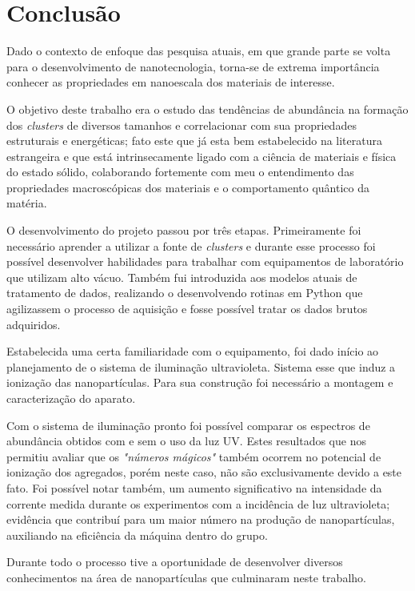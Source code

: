 \chapter{Conclusão}
\label{sec:conclusao}

Dado o contexto de enfoque das pesquisa atuais, em que grande parte se volta para o desenvolvimento de nanotecnologia, torna-se de extrema importância conhecer as propriedades em nanoescala dos materiais de interesse.

O objetivo deste trabalho era o estudo das tendências de abundância na formação dos \textit{clusters} de diversos tamanhos e correlacionar com sua propriedades estruturais e energéticas; fato este que já esta bem estabelecido na literatura estrangeira e que está intrinsecamente ligado com a ciência de materiais e física do estado sólido, colaborando fortemente com meu o entendimento das propriedades macroscópicas dos materiais e o comportamento quântico da matéria.

O desenvolvimento do projeto passou por três etapas. Primeiramente foi necessário aprender a utilizar a fonte de \textit{clusters} e durante esse processo foi possível desenvolver habilidades para trabalhar com equipamentos de laboratório que utilizam alto vácuo. Também fui introduzida aos modelos atuais de tratamento de dados, realizando o desenvolvendo rotinas em Python que agilizassem o processo de aquisição e fosse possível tratar os dados brutos adquiridos.

Estabelecida uma certa familiaridade com o equipamento, foi dado início ao planejamento de o sistema de iluminação ultravioleta. Sistema esse que induz a ionização das nanopartículas. Para sua construção foi necessário a montagem e caracterização do aparato.

Com o sistema de iluminação pronto foi possível comparar os espectros de abundância obtidos com e sem o uso da luz UV. Estes resultados que nos permitiu avaliar que os \textit{"números mágicos"} também ocorrem no potencial de ionização dos agregados, porém neste caso, não são exclusivamente devido a este fato. Foi possível notar também, um aumento significativo na intensidade da corrente medida durante os experimentos com a incidência de luz ultravioleta; evidência que contribuí para um maior número na produção de nanopartículas, auxiliando na eficiência da máquina dentro do grupo.

Durante todo o processo tive a oportunidade de desenvolver diversos conhecimentos na área de nanopartículas que culminaram neste trabalho.


